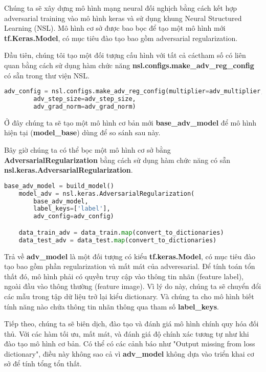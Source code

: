 Chúng ta sẽ xây dựng mô hình mạng neural đối nghịch bằng cách kết hợp adversarial training vào mô hình keras và sử dụng khung Neural Structured Learning (NSL).
Mô hình cơ sở được bao bọc để tạo một mô hình mới \textbf{tf.Keras.Model}, có mục tiêu đào tạo bao gồm adversarial regularization.

Đầu tiên, chúng tôi tạo một đối tượng cấu hình với tất cả cáctham số có liên quan bằng cách sử dụng hàm chức năng \textbf{nsl.configs.make\_adv\_reg\_config} có sẵn trong thư viện NSL.

\begin{lstlisting}[language=Python]
    adv_config = nsl.configs.make_adv_reg_config(multiplier=adv_multiplier, 
        adv_step_size=adv_step_size, 
        adv_grad_norm=adv_grad_norm)
\end{lstlisting}

Ở đây chúng ta sẽ tạo một mô hình cơ bản mới \textbf{base\_adv\_model} để mô hình hiện tại (\textbf{model\_base}) dùng để so sánh sau này.

Bây giờ chúng ta có thể bọc một mô hình cơ sở bằng \textbf{AdversarialRegularization} bằng cách sử dụng hàm chức năng
có sẵn \textbf{nsl.keras.AdversarialRegularization}.

\begin{lstlisting}[language=Python]
    base_adv_model = build_model()
    model_adv = nsl.keras.AdversarialRegularization(
        base_adv_model,
        label_keys=['label'],
        adv_config=adv_config)

    data_train_adv = data_train.map(convert_to_dictionaries)
    data_test_adv = data_test.map(convert_to_dictionaries)
\end{lstlisting}

Trả về \textbf{adv\_model} là một đối tượng có kiểu \textbf{tf.keras.Model}, có mục tiêu đào tạo bao gồm phần regularization và mất mát của adveresarial. Để tính toán tổn thất đó, mô hình phải có quyền truy cập 
vào thông tin nhãn (feature label), ngoài đầu vào thông thường (feature image). Vì lý do này, chúng ta sẽ chuyển đổi các mẫu trong tập dữ liệu trở lại kiểu dictionary. Và chúng ta cho mô 
hình biết tính năng nào chứa thông tin nhãn thông qua tham số \textbf{label\_keys}.

Tiếp theo, chúng ta sẽ biên dịch, đào tạo và đánh giá mô hình chính quy hóa đối thủ. Với các hàm tối ưu, mất mát, và đánh giá độ chính xác tương tự như khi đào tạo mô hình cơ bản.
Có thể có các cảnh báo như "Output missing from loss dictionary", điều này không sao cả vì \textbf{adv\_model} không dựa vào triển khai cơ sở để tính tổng tổn thất.



